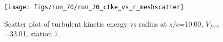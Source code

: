 \begin{figure}[H]
\centering
\texttt{[image: figs/run\_70/run\_70\_ctke\_vs\_r\_meshscatter]}
\caption{Scatter plot of turbulent kinetic energy vs radius at $z/c$=10.00, $V_{free}$=33.01, station 7.}
\end{figure}


